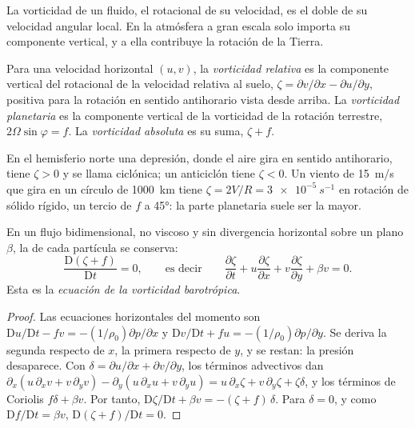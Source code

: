 La vorticidad de un fluido, el rotacional de su velocidad, es el doble de su
velocidad angular local. En la atmósfera a gran escala solo importa su
componente vertical, y a ella contribuye la rotación de la Tierra.

\begin{definition}\label{def:b3:atmospheric-dynamics:vorticity-kinds}
Para una velocidad horizontal $(u, v)$, la \emph{vorticidad
relativa} es la componente vertical del rotacional
de la velocidad relativa al suelo, $\zeta = \partial v/\partial x -
\partial u/\partial y$, positiva para la rotación en sentido antihorario vista desde arriba.
La \emph{vorticidad planetaria} es la componente vertical de la
vorticidad de la rotación terrestre, $2\Omega\sin\varphi =
f$. La \emph{vorticidad absoluta} es su suma,
$\zeta + f$.
\end{definition}

En el hemisferio norte una depresión, donde el aire gira en sentido antihorario,
tiene $\zeta > 0$ y se llama ciclónica; un anticiclón tiene $\zeta < 0$. Un
viento de \qty{15}{m/s} que gira en un círculo de \qty{1000}{km} tiene $\zeta =
2V/R = \qty{3e-5}{s^{-1}}$ en rotación de sólido rígido, un tercio de $f$ a \ang{45}:
la parte planetaria suele ser la mayor.

\begin{theorem}\label{thm:b3:atmospheric-dynamics:bve}
En un flujo bidimensional, no viscoso y sin divergencia horizontal sobre un
plano $\beta$, la  de cada partícula se conserva:
\[
\frac{\mathrm D(\zeta + f)}{\mathrm Dt} = 0 ,
\qquad\text{es decir}\qquad
\frac{\partial\zeta}{\partial t} + u\frac{\partial\zeta}{\partial x} + v\frac{\partial\zeta}{\partial y} + \beta v = 0 .
\]
Esta es la \emph{ecuación de la vorticidad barotrópica}.
\end{theorem}

\begin{proof}
Las ecuaciones horizontales del momento son $\mathrm Du/\mathrm Dt - fv =
-(1/\rho_0)\partial p/\partial x$ y $\mathrm Dv/\mathrm Dt + fu =
-(1/\rho_0)\partial p/\partial y$. Se deriva la segunda respecto de
$x$, la primera respecto de $y$, y se restan: la presión desaparece.
Con $\delta = \partial u/\partial x + \partial v/\partial y$, los
términos advectivos dan $\partial_x(u\,\partial_xv + v\,\partial_yv) -
\partial_y(u\,\partial_xu + v\,\partial_yu) = u\,\partial_x\zeta +
v\,\partial_y\zeta + \zeta\delta$, y los términos de Coriolis $f\delta + \beta
v$. Por tanto, $\mathrm D\zeta/\mathrm Dt + \beta v = -(\zeta + f)\,\delta$. Para
$\delta = 0$, y como $\mathrm Df/\mathrm Dt = \beta v$, $\mathrm D(\zeta +
f)/\mathrm Dt = 0$.
\end{proof}

